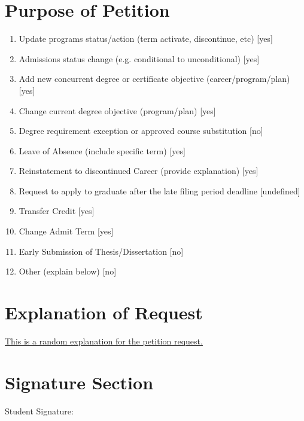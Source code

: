 \documentclass[a4paper,12pt]{article}
\begin{document}
\section*{Purpose of Petition}
\begin{enumerate}
    \item Update programs status/action (term activate, discontinue, etc) \hfill [yes]
    \item Admissions status change (e.g. conditional to unconditional) \hfill [yes]
    \item Add new concurrent degree or certificate objective (career/program/plan) \hfill [yes]
    \item Change current degree objective (program/plan) \hfill [yes]
    \item Degree requirement exception or approved course substitution \hfill [no]
    \item Leave of Absence (include specific term) \hfill [yes]
    \item Reinstatement to discontinued Career (provide explanation) \hfill [yes]
    \item Request to apply to graduate after the late filing period deadline \hfill [undefined]
    \item Transfer Credit \hfill [yes]
    \item Change Admit Term \hfill [yes]
    \item Early Submission of Thesis/Dissertation \hfill [no]
    \item Other (explain below) \hfill [no]
\end{enumerate}

\section*{Explanation of Request}
\begin{flushleft}
\underline{\hspace{15cm} This is a random explanation for the petition request.} \\
\end{flushleft}

\section*{Signature Section}
Student Signature: \underline{\hspace{7cm}}
\end{document}
